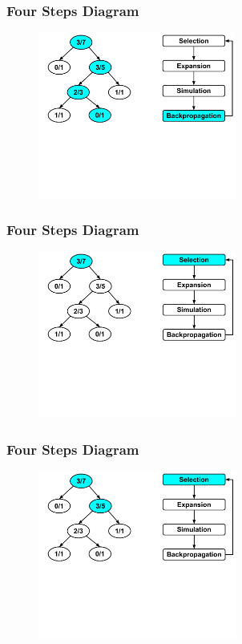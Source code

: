 \documentclass{beamer}
\begin{document}
\begin{frame}[fragile]
\frametitle{Four Steps Diagram}
\begin{figure}[h]
	\includegraphics[width=6.5cm]{Diagrams/MCTSShort/MCTSShortOneFourFour.pdf}
	\centering
\end{figure}
\end{frame}


\begin{frame}[fragile]
\frametitle{Four Steps Diagram}
\begin{figure}[h]
	\includegraphics[width=6.5cm]{Diagrams/MCTSShort/MCTSShortTwoOneOne.pdf}
	\centering
\end{figure}
\end{frame}

\begin{frame}[fragile]
\frametitle{Four Steps Diagram}
\begin{figure}[h]
	\includegraphics[width=6.5cm]{Diagrams/MCTSShort/MCTSShortTwoOneTwo.pdf}
	\centering
\end{figure}
\end{frame}
\end{document}
